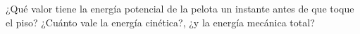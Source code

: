 ¿Qué valor tiene la energía potencial de la pelota un instante
antes de que toque el piso? ¿Cuánto vale la energía cinética?,
¿y la energía mecánica total?


\begin{solutionbox}{1.5cm}

\end{solutionbox}
